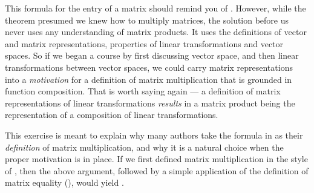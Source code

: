 %
This formula for the entry of a matrix should remind you of .  However, while the theorem presumed we knew how to multiply matrices, the solution before us never uses any understanding of matrix products.  It uses the definitions of vector and matrix representations, properties of linear transformations and vector spaces.  So if we began a course by first discussing vector space, and then linear transformations between vector spaces, we could carry matrix representations into a {\em motivation} for a definition of matrix multiplication that is grounded in function composition.  That is worth saying again --- a definition of matrix representations of linear transformations {\em results} in a matrix product being the representation of a composition of linear transformations.\par
%
This exercise is meant to explain why many authors take the formula in  as their {\em definition} of matrix multiplication, and why it is a natural choice when the proper motivation is in place.  If we first defined matrix multiplication in the style of , then the above argument, followed by a simple application of the definition of matrix equality (), would yield .